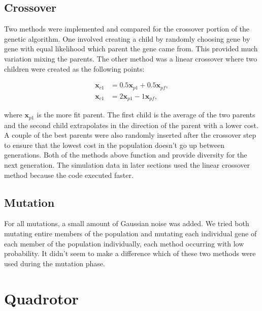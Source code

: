 \documentclass[letterpaper, 10 pt, conference]{ieeeconf}  %
\begin{document}
	
	
	
	\subsection{Crossover}
	Two methods were implemented and compared for the crossover portion of the genetic algorithm. One involved creating a child by randomly choosing gene by gene with equal likelihood which parent the gene came from. This provided much variation mixing the parents. The other method was a linear crossover where two children were created as the following points:
	
	\begin{equation}
	\label{eq:child1}
	\begin{aligned}
	\mathbf{x}_{c1}&=0.5\mathbf{x}_{p1}+0.5\mathbf{x}_{pf}, \\
	\mathbf{x}_{c1}&=2\mathbf{x}_{p1}-1\mathbf{x}_{pf},
	\end{aligned}
	\end{equation}
	
	where $\mathbf{x}_{p1}$ is the more fit parent. The first child is the average of the two parents and the second child extrapolates in the direction of the parent with a lower cost. A couple of the best parents were also randomly inserted after the crossover step to ensure that the lowest cost in the population doesn't go up between generations. Both of the methods above function and provide diversity for the next generation. The simulation data in later sections used the linear crossover method because the code executed faster.
	
	
	\subsection{Mutation}
	
	For all mutations, a small amount of Gaussian noise was added. We tried both mutating entire members of the population and mutating each individual gene of each member of the population individually, each method occurring with low probability. It didn't seem to make a difference which of these two methods were used during the mutation phase.
	
	
	
	
	\section{Quadrotor}
	\label{subsub:quad}
	
\end{document}
